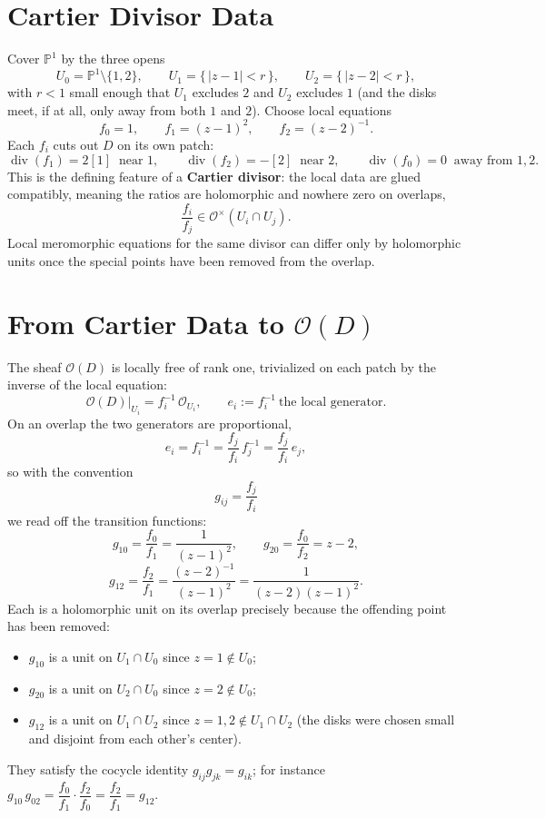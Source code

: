 \documentclass[11pt]{article}
\newcommand{\PP}{\mathbb P}
\newcommand{\OO}{\mathcal O}
\newcommand{\divisor}{\operatorname{div}}
\theoremstyle{definition}
\theoremstyle{plain}
\begin{document}
\section{Cartier Divisor Data}
Cover \(\PP^1\) by the three opens
\[
  U_0=\PP^1\setminus\{1,2\},\qquad
  U_1=\{\,|z-1|<r\,\},\qquad
  U_2=\{\,|z-2|<r\,\},
\]
with \(r<1\) small enough that \(U_1\) excludes \(2\) and \(U_2\) excludes \(1\)
(and the disks meet, if at all, only away from both \(1\) and \(2\)). Choose
local equations
\[
  f_0=1,\qquad f_1=(z-1)^2,\qquad f_2=(z-2)^{-1}.
\]
Each \(f_i\) cuts out \(D\) on its own patch:
\[
  \divisor(f_1)=2[1]\ \text{ near }1,\qquad
  \divisor(f_2)=-[2]\ \text{ near }2,\qquad
  \divisor(f_0)=0\ \text{ away from }1,2 .
\]
This is the defining feature of a \textbf{Cartier divisor}: the local data are
glued compatibly, meaning the ratios are holomorphic and nowhere zero on
overlaps,
\[
  \frac{f_i}{f_j}\in\OO^\times(U_i\cap U_j).
\]
Local meromorphic equations for the same divisor can differ only by holomorphic
units once the special points have been removed from the overlap.

\section{From Cartier Data to \(\OO(D)\)}
The sheaf \(\OO(D)\) is locally free of rank one, trivialized on each patch by
the inverse of the local equation:
\[
  \OO(D)\big|_{U_i}=f_i^{-1}\,\OO_{U_i},
  \qquad
  e_i:=f_i^{-1}\ \text{the local generator.}
\]
On an overlap the two generators are proportional,
\[
  e_i=f_i^{-1}=\frac{f_j}{f_i}\,f_j^{-1}=\frac{f_j}{f_i}\,e_j,
\]
so with the convention
\[
  g_{ij}=\frac{f_j}{f_i}
\]
we read off the transition functions:
\[
  g_{10}=\frac{f_0}{f_1}=\frac{1}{(z-1)^2},
  \qquad
  g_{20}=\frac{f_0}{f_2}=z-2,
\]
\[
  g_{12}=\frac{f_2}{f_1}=\frac{(z-2)^{-1}}{(z-1)^2}=\frac{1}{(z-2)(z-1)^2}.
\]
Each is a holomorphic unit on its overlap precisely because the offending
point has been removed:
\begin{itemize}
  \item \(g_{10}\) is a unit on \(U_1\cap U_0\) since \(z=1\notin U_0\);
  \item \(g_{20}\) is a unit on \(U_2\cap U_0\) since \(z=2\notin U_0\);
  \item \(g_{12}\) is a unit on \(U_1\cap U_2\) since \(z=1,2\notin U_1\cap U_2\)
        (the disks were chosen small and disjoint from each other's center).
\end{itemize}
They satisfy the cocycle identity \(g_{ij}g_{jk}=g_{ik}\); for instance
\(g_{10}\,g_{02}=\dfrac{f_0}{f_1}\cdot\dfrac{f_2}{f_0}=\dfrac{f_2}{f_1}=g_{12}\).
\end{document}
